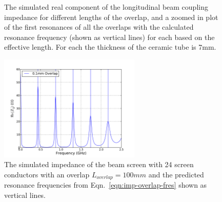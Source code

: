\begin{figure}
\caption{ The simulated real component of the longitudinal beam coupling impedance for different lengths of the overlap, and  a zoomed in plot of the first resonances of all the overlaps with the calculated resonance frequency (shown as vertical lines) for each based on the effective length. For each the thickness of the ceramic tube is 7mm.}
\label{fig:mki-overlap-imp-tot}
\end{figure}

\begin{figure}
\begin{center}
\includegraphics[width=0.6\textwidth]{LHC_MKI/figures/mki-overlap-fres-100mm.pdf}
\end{center}
\caption{The simulated impedance of the beam screen with 24 screen conductors with an overlap $L_{overlap}=100mm$ and the predicted resonance frequencies from Eqn.~\ref{eqn:imp-overlap-fres} shown as vertical lines.}
\label{fig:imp-overlap-fres}
\end{figure}

